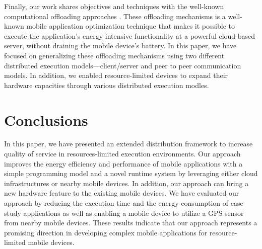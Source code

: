 \documentclass{sig-alternate}
\begin{document}
Finally, our work shares objectives and techniques with the well-known computational offloading approaches \cite{maui,comet,mobile-cloud-middleware,fuzzy-engine}. These offloading mechanisms is a well-known mobile application optimization technique that makes it possible to execute the application's energy intensive functionality at a powerful cloud-based server, without draining the mobile device's battery. In this paper, we have focused on generalizing these offloading mechanisms using two different distributed execution models---client/server and peer to peer communication models. In addition, we enabled resource-limited devices to expand their hardware capacities through various distributed execution modles.

\section{Conclusions}
\label{sec:conc}
%
In this paper, we have presented an extended distribution framework to increase quality of service in resources-limited execution environments. Our approach improves the energy efficiency and performance of mobile applications with a simple programming model and a novel runtime system by leveraging either cloud infrastructures or nearby mobile devices. In addition, our approach can bring a new hardware feature to the existing mobile devices. We have evaluated our approach by reducing the execution time and the energy consumption of case study applications as well as enabling a mobile device to utilize a GPS sensor from nearby mobile devices. These results indicate that our approach represents a promising direction in developing complex mobile applications for resource-limited mobile devices.


\balance


\end{document}
